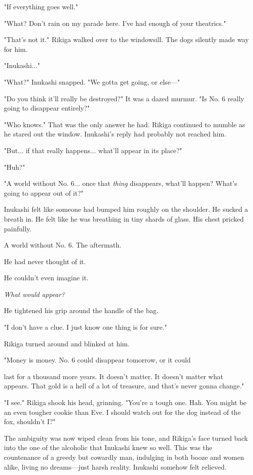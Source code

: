"If everything goes well."

"What? Don't rain on my parade here. I've had enough of your theatrics."

"That's not it." Rikiga walked over to the windowsill. The dogs silently
made way for him.

"Inukashi..."

"What?" Inukashi snapped. "We gotta get going, or else---"

"Do you think it'll really be destroyed?" It was a dazed murmur. "Is No.
6 really going to disappear entirely?"

"Who knows." That was the only answer he had. Rikiga continued to mumble
as he stared out the window. Inukashi's reply had probably not reached
him.

"But... if that really happens... what'll appear in its place?"

"Huh?"

"A world without No. 6... once that \emph{thing} disappears, what'll happen?
What's going to appear out of it?"

Inukashi felt like someone had bumped him roughly on the shoulder. He
sucked a breath in. He felt like he was breathing in tiny shards of
glass. His chest pricked painfully.

A world without No. 6. The aftermath.

He had never thought of it.

He couldn't even imagine it.

\emph{What would appear?}

He tightened his grip around the handle of the bag.

"I don't have a clue. I just know one thing is for sure."

Rikiga turned around and blinked at him.

"Money is money. No. 6 could disappear tomorrow, or it could~

last for a thousand more years. It doesn't matter. It doesn't matter
what appears. That gold is a hell of a lot of treasure, and that's never
gonna change."

"I see." Rikiga shook his head, grinning. "You're a tough one. Hah. You
might be an even tougher cookie than Eve. I should watch out for the dog
instead of the fox, shouldn't I?"

The ambiguity was now wiped clean from his tone, and Rikiga's face
turned back into the one of the alcoholic that Inukashi knew so well.
This was the countenance of a greedy but cowardly man, indulging in both
booze and women alike, living no dreams---just harsh reality. Inukashi
somehow felt relieved.

